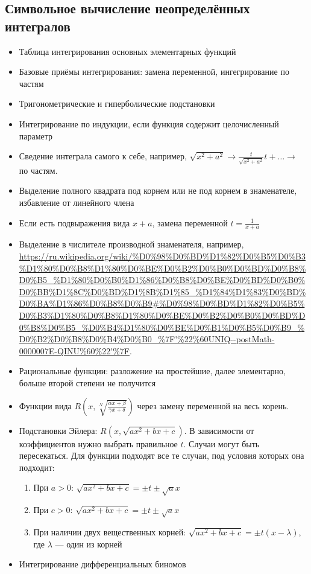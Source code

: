 \documentclass[12pt, a4paper]{article}
\begin{document}
  \subsection{Символьное вычисление неопределённых интегралов}

    \begin{itemize}
      \item Таблица интегрирования основных элементарных функций
      \item Базовые приёмы интегрирования: замена переменной, ингегрирование по частям
      \item Тригонометрические и гиперболические подстановки
      \item Интегрирование по индукции, если функция содержит целочисленный параметр
      \item Сведение интеграла самого к себе, например, $\sqrt{x^2 + a^2} \rightarrow \frac{t}{\sqrt{x^2 + a^2}} t + \ldots \rightarrow$ по частям.
      \item Выделение полного квадрата под корнем или не под корнем в знаменателе, избавление от линейного члена
      \item Если есть подвыражения вида $x + a$, замена переменной $t = \frac{1}{x + a}$
      \item Выделение в числителе производной знаменателя, например, \url{https://ru.wikipedia.org/wiki/%D0%98%D0%BD%D1%82%D0%B5%D0%B3%D1%80%D0%B8%D1%80%D0%BE%D0%B2%D0%B0%D0%BD%D0%B8%D0%B5_%D1%80%D0%B0%D1%86%D0%B8%D0%BE%D0%BD%D0%B0%D0%BB%D1%8C%D0%BD%D1%8B%D1%85_%D1%84%D1%83%D0%BD%D0%BA%D1%86%D0%B8%D0%B9#%D0%98%D0%BD%D1%82%D0%B5%D0%B3%D1%80%D0%B8%D1%80%D0%BE%D0%B2%D0%B0%D0%BD%D0%B8%D0%B5_%D0%B4%D1%80%D0%BE%D0%B1%D0%B5%D0%B9_%D0%B2%D0%B8%D0%B4%D0%B0_%7F'%22%60UNIQ--postMath-0000007E-QINU%60%22'%7F}.
      \item Рациональные функции: разложение на простейшие, далее элементарно, больше второй степени не получится
      \item Функции вида $R\left(x, \sqrt[N]{\frac{\alpha x + \beta}{\gamma x + \delta}}\right)$ через замену переменной на весь корень.
      \item Подстановки Эйлера: $R\left(x, \sqrt{ax^2 + bx + c}\right)$. В зависимости от коэффициентов нужно выбрать правильное $t$. 
      Случаи могут быть пересекаться. Для функции подходят все те случаи, под условия которых она подходит:
      \begin{enumerate}
        \item При $a > 0$: ${\sqrt {ax^{2}+bx+c}}=\pm t\pm {\sqrt {a}}x$
        \item При $c > 0$: ${ {\sqrt {ax^{2}+bx+c}}=\pm t\pm {\sqrt {a}}x}$
        \item При наличии двух вещественных корней: ${{\sqrt {ax^{2}+bx+c}}=\pm t(x-\lambda )}$, где $\lambda$ — один из корней
      \end{enumerate}
      \item Интегрирование дифференциальных биномов
      

\end{itemize}
\end{document}
